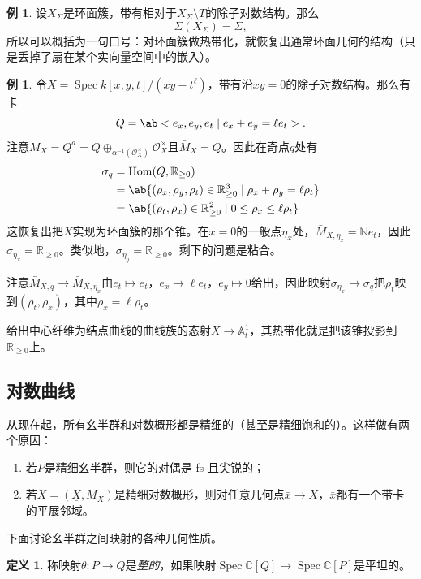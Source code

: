 \documentclass{amsart}
\theoremstyle{definition}
\newtheorem{defn}[thm]{定义}
\newtheorem{exm}[thm]{例}
\theoremstyle{remark}
\theoremstyle{plain}
\theoremstyle{definition}
\theoremstyle{remark}
\newcommand{\A}{\mathbb{A}}
\newcommand{\N}{\mathbb{N}}
\newcommand{\R}{\mathbb{R}}
\newcommand{\C}{\mathbb{C}}
\newcommand{\mc}[1]{\mathcal{#1}}
\newcommand{\ul}[1]{\underline{#1}}
\newcommand{\1}{\mathbf{1}}
\newcommand{\2}{\mathbf{2}}
\newcommand{\3}{\mathbf{3}}
\DeclareMathOperator{\Hom}{Hom}
\DeclareMathOperator{\Spec}{Spec}
\begin{document}
\begin{exm}
    设\(X_{\Sigma}\)是环面簇，带有相对于\(X_{\Sigma} \setminus T\)的除子对数结构。那么
    \[ \Sigma(X_{\Sigma}) = \Sigma, \]
    所以可以概括为一句口号：对环面簇做热带化，就恢复出通常环面几何的结构（只是丢掉了扇在某个实向量空间中的嵌入）。
\end{exm}

\begin{exm}
    令\(X = \Spec k[x,y,t]/(xy-t^{\ell})\)，带有沿\(xy = 0\)的除子对数结构。那么有卡
    \[ Q = \ab<e_x, e_y, e_t \mid e_x + e_y = \ell e_t>. \]
    注意\(M_X = Q^a = Q \oplus_{\alpha^{-1}(\mc{O}_X^{\times})} \mc{O}_X^{\times}\)且\(\bar{M}_X = Q\)。因此在奇点\(q\)处有
    \begin{align*}
        \sigma_q &= \Hom(Q, \R_{\geq 0}) \\
        &= \ab\{ (\rho_x, \rho_y, \rho_t) \in \R_{\geq 0}^3 \mid \rho_x + \rho_y = \ell \rho_t \} \\
        &= \ab\{ (\rho_t, \rho_x) \in \R_{\geq 0}^2 \mid 0 \leq \rho_x \leq \ell \rho_t \}
    \end{align*}
    这恢复出把\(X\)实现为环面簇的那个锥。在\(x = 0\)的一般点\(\eta_x\)处，\(\bar{M}_{X, \eta_x} = \N e_t\)，因此\(\sigma_{\eta_x} = \R_{\geq 0}\)。类似地，\(\sigma_{\eta_y} = \R_{\geq 0}\)。剩下的问题是粘合。

    注意\(\bar{M}_{X, q} \to \bar{M}_{X, \eta_x}\)由\(e_t \mapsto e_t\)，\(e_x \mapsto \ell e_t\)，\(e_y \mapsto 0\)给出，因此映射\(\sigma_{\eta_x} \to \sigma_q\)把\(\rho_t\)映到\((\rho_t, \rho_x)\)，其中\(\rho_x = \ell \rho_t\)。

    给出中心纤维为结点曲线的曲线族的态射\(X \to \A^1_t\)，其热带化就是把该锥投影到\(\R_{\geq 0}\)上。
\end{exm}


\subsection{对数曲线}%
\label{sub:Log curves}

从现在起，所有幺半群和对数概形都是精细的（甚至是精细饱和的）。这样做有两个原因：
\begin{enumerate}
    \item 若\(P\)是精细幺半群，则它的对偶是 fs 且尖锐的；
    \item 若\(X = (\ul{X}, M_X)\)是精细对数概形，则对任意几何点\(\bar{x} \to X\)，\(\bar{x}\)都有一个带卡的平展邻域。
\end{enumerate}

下面讨论幺半群之间映射的各种几何性质。
\begin{defn}
    称映射\(\theta \colon P \to Q\)是\textit{整的}，如果映射\(\Spec\C[Q] \to \Spec \C[P]\)是平坦的。
\end{defn}
\end{document}
